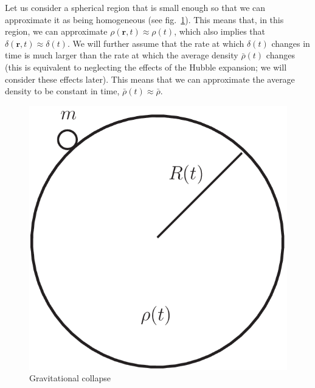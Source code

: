 \documentclass[11pt, a4paper,oneside,openright]{book}
\numberwithin{equation}{section}
\begin{document}
Let us consider a spherical region that is small enough so that we can approximate it as being homogeneous (see fig.\ \ref{fig:lec8_4}). This means that, in this region, we can approximate $\rho(\mathbf{r},t)\approx \rho(t)$, which also implies that $\delta(\mathbf{r},t)\approx \delta(t)$. We will further assume that the rate at which $\delta(t)$ changes in time is much larger than the rate at which the average density $\bar{\rho}(t)$ changes (this is equivalent to neglecting the effects of the Hubble expansion; we will consider these effects later). This means that we can approximate the average density to be constant in time, $\bar{\rho}(t)\approx \bar{\rho}$.
\begin{figure}[ht]
\begin{center}
\includegraphics[scale=0.3]{Draw/lec8_4.png}
\end{center}
\caption{Gravitational collapse}
\label{fig:lec8_4}
\end{figure}
\end{document}
